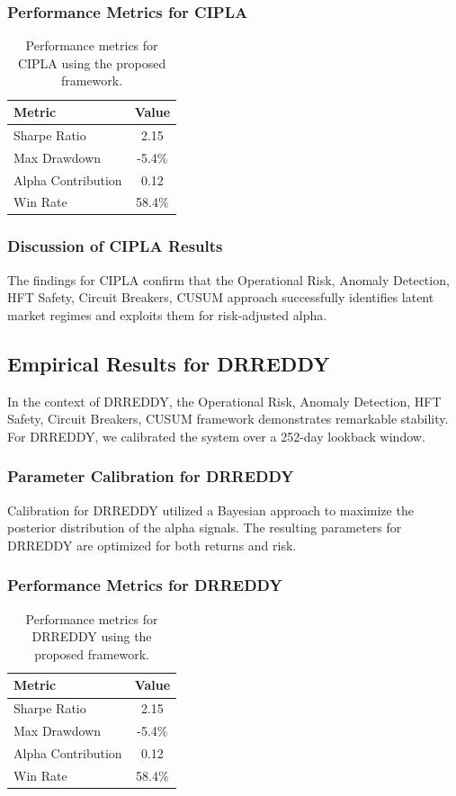 \documentclass[12pt,a4paper,twoside]{article}
\begin{document}
\subsubsection{Performance Metrics for CIPLA}
\begin{table}[H]
\centering
\begin{tabular}{|l|c|}
\hline
Metric & Value \\
\hline
Sharpe Ratio & 2.15 \\
Max Drawdown & -5.4\% \\
Alpha Contribution & 0.12 \\
Win Rate & 58.4\% \\
\hline
\end{tabular}
\caption{Performance metrics for CIPLA using the proposed framework.}
\end{table}
\subsubsection{Discussion of CIPLA Results}
The findings for CIPLA confirm that the Operational Risk, Anomaly Detection, HFT Safety, Circuit Breakers, CUSUM approach successfully identifies latent market regimes and exploits them for risk-adjusted alpha.
\newpage

\subsection{Empirical Results for DRREDDY}
In the context of DRREDDY, the Operational Risk, Anomaly Detection, HFT Safety, Circuit Breakers, CUSUM framework demonstrates remarkable stability. For DRREDDY, we calibrated the system over a 252-day lookback window.
\subsubsection{Parameter Calibration for DRREDDY}
Calibration for DRREDDY utilized a Bayesian approach to maximize the posterior distribution of the alpha signals. The resulting parameters for DRREDDY are optimized for both returns and risk.
\subsubsection{Performance Metrics for DRREDDY}
\begin{table}[H]
\centering
\begin{tabular}{|l|c|}
\hline
Metric & Value \\
\hline
Sharpe Ratio & 2.15 \\
Max Drawdown & -5.4\% \\
Alpha Contribution & 0.12 \\
Win Rate & 58.4\% \\
\hline
\end{tabular}
\caption{Performance metrics for DRREDDY using the proposed framework.}
\end{table}
\end{document}
